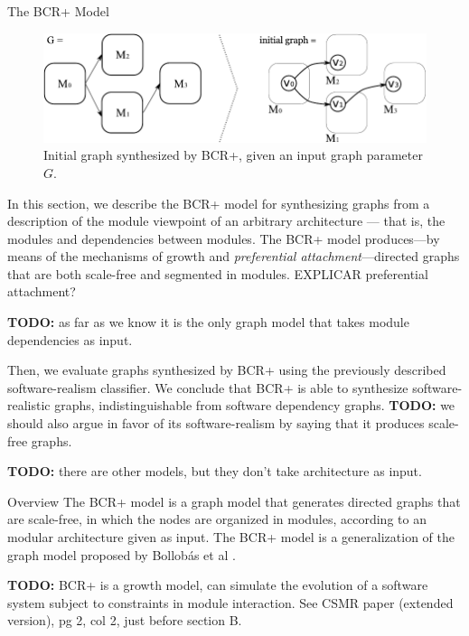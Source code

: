 \documentclass[11pt,twocolumn,a4paper,english]{article}
\newcommand{\TODO}{\textbf{TODO:} }
\begin{document}
\begin{section}{The BCR+ Model}	\label{sec:bcr}
	
\begin{figure}[tbp]
	\centering
		\includegraphics[scale=1]{figures/bcr-initial-graph}
	\caption{Initial graph synthesized by BCR+, given an input graph parameter $G$.}
	\label{fig:bcr-initial-graph}
\end{figure}	
	
	In this section, we describe the BCR+ model for synthesizing graphs from a description of the module viewpoint of an arbitrary architecture --- that is, the modules and dependencies between modules. The BCR+ model produces---by means of the mechanisms of growth and \textit{preferential attachment}---directed graphs that are both scale-free and segmented in modules. EXPLICAR  preferential attachment?
	
	\TODO as far as we know it is the only graph model that takes module dependencies as input.
	
	Then, we evaluate graphs synthesized by BCR+ using the previously described software-realism classifier. We conclude that BCR+ is able to synthesize software-realistic graphs, indistinguishable from software dependency graphs. \TODO we should also argue in favor of its software-realism by saying that it produces scale-free graphs.
	
	\TODO there are other models, but they don't take architecture as input.
	
\begin{subsection}{Overview}
	The BCR+ model is a graph model that generates directed graphs that are scale-free, in which the nodes are organized in modules, according to an modular architecture given as input.
The BCR+ model is a generalization of the graph model proposed by Bollobás et al \cite{Bollobas2003}. 
	
	\TODO BCR+ is a growth model, can simulate the evolution of a software system subject to constraints in module interaction. See CSMR paper (extended version), pg 2, col 2, just before section B. 
	

\end{subsection}
\end{section}
\end{document}
